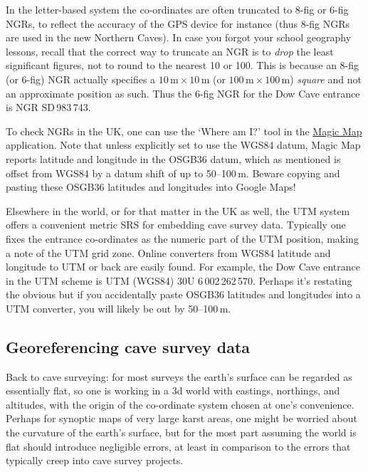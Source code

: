 \documentclass[]{article}
\begin{document}
In the letter-based system the co-ordinates are often truncated to 8-fig
or 6-fig NGRs, to reflect the accuracy of the GPS device for instance
(thus 8-fig NGRs are used in the new Northern Caves). In case you forgot
your school geography lessons, recall that the correct way to truncate
an NGR is to \emph{drop} the least significant figures, not to round to
the nearest 10 or 100. This is because an 8-fig (or 6-fig) NGR actually
specifies a $10\,\mathrm{m}\times10\,\mathrm{m}$
(or $100\,\mathrm{m}\times100\,\mathrm{m}$) \emph{square} and not an
approximate position as such. Thus the 6-fig NGR for the Dow Cave
entrance is NGR SD\,983\,743.

To check NGRs in the UK, one can use the `Where am I?' tool in the
\href{http://www.natureonthemap.naturalengland.org.uk/MagicMap.aspx}{Magic
Map} application. Note that unless explicitly set to use the WGS84
datum, Magic Map reports latitude and longitude in the OSGB36 datum,
which as mentioned is offset from WGS84 by a datum shift of up to
50--100\,m. Beware copying and pasting these OSGB36 latitudes and
longitudes into Google Maps!

Elsewhere in the world, or for that matter in the UK as well, the UTM
system offers a convenient metric SRS for embedding cave survey data.
Typically one fixes the entrance co-ordinates as the numeric part of the
UTM position, making a note of the UTM grid zone. Online converters from
WGS84 latitude and longitude to UTM or back are easily found. For
example, the Dow Cave entrance in the UTM scheme is UTM (WGS84)
30U 6\,002\,262\,570. Perhaps it's restating the obvious but if you
accidentally paste OSGB36 latitudes and longitudes into a UTM converter,
you will likely be out by 50--100\,m.

\subsection{Georeferencing cave survey
data}\label{georeferencing-cave-survey-data}

Back to cave surveying: for most surveys the earth's surface can be
regarded as essentially flat, so one is working in a 3d world with
eastings, northings, and altitudes, with the origin of the co-ordinate
system chosen at one's convenience. Perhaps for synoptic maps of very
large karst areas, one might be worried about the curvature of the
earth's surface, but for the most part assuming the world is flat should
introduce negligible errors, at least in comparison to the errors that
typically creep into cave survey projects.
\end{document}
